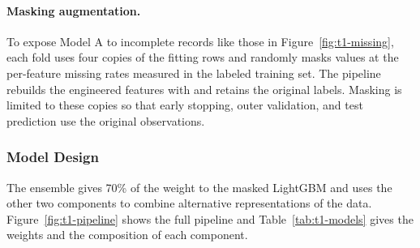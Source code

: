 \documentclass[../main.tex]{subfiles}
\begin{document}
\paragraph{Masking augmentation.} To expose Model A to incomplete records like those in Figure~\ref{fig:t1-missing}, each fold uses four copies of the fitting rows and randomly masks values at the per-feature missing rates measured in the labeled training set. The pipeline rebuilds the engineered features with  and retains the original labels. Masking is limited to these copies so that early stopping, outer validation, and test prediction use the original observations.

\subsubsection{Model Design}

The ensemble gives 70\% of the weight to the masked LightGBM and uses the other two components to combine alternative representations of the data. Figure~\ref{fig:t1-pipeline} shows the full pipeline and Table~\ref{tab:t1-models} gives the weights and the composition of each component.
\end{document}
